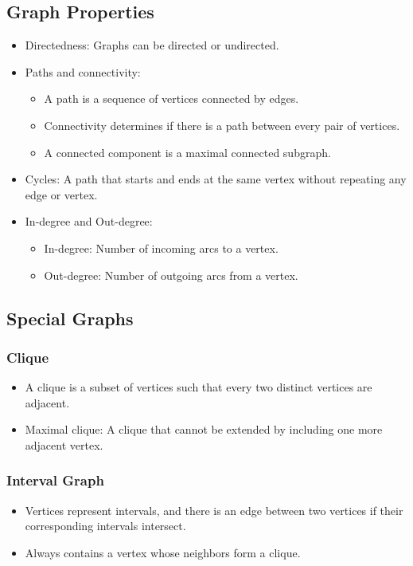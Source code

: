 \documentclass[8pt]{article}
\begin{document}
\subsection*{Graph Properties}
\begin{itemize}
    \item Directedness: Graphs can be directed or undirected.
    \item Paths and connectivity:
    \begin{itemize}
        \item A path is a sequence of vertices connected by edges.
        \item Connectivity determines if there is a path between every pair of vertices.
        \item A connected component is a maximal connected subgraph.
    \end{itemize}
    \item Cycles: A path that starts and ends at the same vertex without repeating any edge or vertex.
    \item In-degree and Out-degree:
    \begin{itemize}
        \item In-degree: Number of incoming arcs to a vertex.
        \item Out-degree: Number of outgoing arcs from a vertex.
    \end{itemize}
\end{itemize}

\subsection*{Special Graphs}
\subsubsection*{Clique}
\begin{itemize}
    \item A clique is a subset of vertices such that every two distinct vertices are adjacent.
    \item Maximal clique: A clique that cannot be extended by including one more adjacent vertex.
\end{itemize}

\subsubsection*{Interval Graph}
\begin{itemize}
    \item Vertices represent intervals, and there is an edge between two vertices if their corresponding intervals intersect.
    \item Always contains a vertex whose neighbors form a clique.
\end{itemize}
\end{document}
